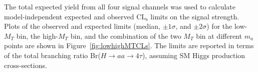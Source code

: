 The total expected yield from all four signal channels was used to calculate model-independent expected and observed $\text{CL}_{\text{s}}$ limits on the signal strength. Plots of the observed and expected limits (median, $\pm1\sigma$, and $\pm2\sigma$) for the low-$M_{T}$ bin, the high-$M_{T}$ bin, and the combination of the two $M_{T}$ bin at different $m_{a}$ points are shown in Figure~\ref{fig:lowhighMTCLs}. The limits are reported in terms of the total branching ratio Br($H\rightarrow$$aa\rightarrow4\tau$), assuming SM Higgs production cross-sections.


